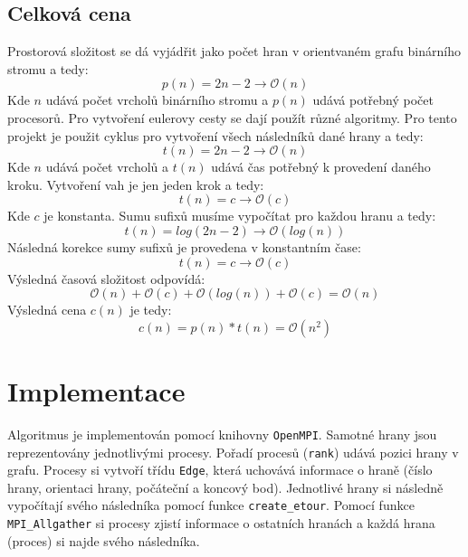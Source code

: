 \documentclass[12pt,a4paper]{article}
\begin{document}
\subsection*{Celková cena}
\label{sub:celkova_cena}
Prostorová složitost se dá vyjádřit jako počet hran v orientvaném grafu binárního stromu a tedy:
\begin{equation}
    p(n) = 2n - 2 \rightarrow \mathcal{O}(n)
\end{equation}
Kde $n$ udává počet vrcholů binárního stromu a $p(n)$ udává potřebný počet procesorů. 
Pro vytvoření eulerovy cesty se dají použít různé algoritmy. Pro tento projekt je použit cyklus pro vytvoření všech následníků dané hrany a tedy:
\begin{equation}
    t(n) = 2n- 2 \rightarrow \mathcal{O}(n)
\end{equation}
Kde $n$ udává počet vrcholů a $t(n)$ udává čas potřebný k provedení daného kroku.
Vytvoření vah je jen jeden krok a tedy:
\begin{equation}
    t(n) = c \rightarrow \mathcal{O}(c)
\end{equation}
Kde $c$ je konstanta.
Sumu sufixů musíme vypočítat pro každou hranu a tedy:
\begin{equation}
    t(n) = log(2n - 2) \rightarrow \mathcal{O}(log(n))
\end{equation}
Následná korekce sumy sufixů je provedena v konstantním čase:
\begin{equation}
    t(n) = c \rightarrow \mathcal{O}(c)
\end{equation}
Výsledná časová složitost odpovídá:
\begin{equation}
    \mathcal{O}(n) + \mathcal{O}(c) + \mathcal{O}(log(n)) + \mathcal{O}(c) = \mathcal{O}(n)
\end{equation}
Výsledná cena $c(n)$ je tedy:
\begin{equation}
    c(n) = p(n) * t(n) = \mathcal{O}(n^2)
\end{equation}

\section{Implementace}
\label{sec:implementace}
Algoritmus je implementován pomocí knihovny \texttt{OpenMPI}. 
Samotné hrany jsou reprezentovány jednotlivými procesy. 
Pořadí procesů (\texttt{rank}) udává pozici hrany v grafu. 
Procesy si vytvoří třídu \texttt{Edge}, která uchovává informace o hraně (číslo hrany, orientaci hrany, počáteční a koncový bod). 
Jednotlivé hrany si následně vypočítají svého následníka pomocí funkce \texttt{create\_etour}. 
Pomocí funkce \texttt{MPI\_Allgather} si procesy zjistí informace o ostatních hranách a každá hrana (proces) si najde svého následníka.
\end{document}
